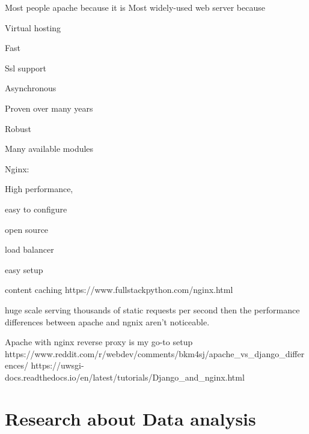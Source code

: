 \documentclass{article}
\begin{document}
\item Most people apache because it is Most widely-used web server because 
\item Virtual hosting
\item Fast
\item Ssl support
\item Asynchronous
\item Proven over many years
\item Robust
\item Many available modules
\item Nginx:
\item High performance,
\item easy to configure
\item open source
\item load balancer
\item easy setup
\item content caching
https://www.fullstackpython.com/nginx.html
\item huge scale serving thousands of static requests per second then the performance differences between apache and ngnix aren’t noticeable. 
\item Apache with nginx reverse proxy is my go-to setup 
https://www.reddit.com/r/webdev/comments/bkm4sj/apache_vs_django_differences/
https://uwsgi-docs.readthedocs.io/en/latest/tutorials/Django_and_nginx.html  
\section{Research about Data analysis}
\end{document}
